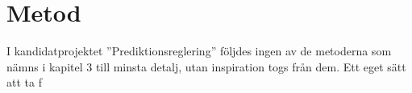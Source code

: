 \section{Metod}
I kandidatprojektet ''Prediktionsreglering'' följdes ingen av de metoderna som nämns i kapitel 3 till minsta detalj, utan inspiration togs från dem. Ett eget sätt att ta f
